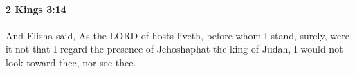 
		\paragraph{2 Kings 3:14} %
			\label{2KINGS-3-14}

			And Elisha said, As the LORD of hosts liveth, before whom I stand, surely, were it not that I regard the presence of Jehoshaphat the king of Judah, I would not look toward thee, nor see thee.


